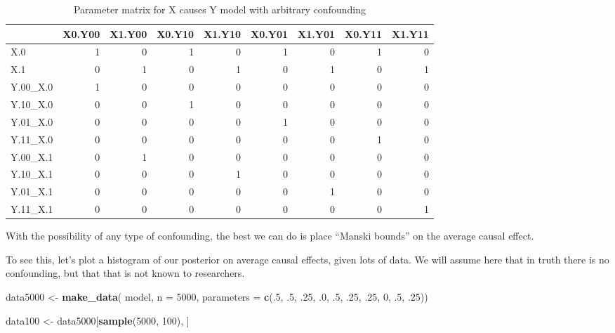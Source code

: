 \documentclass[
  12pt,
]{book}
\newenvironment{Shaded}{\begin{snugshade}}{\end{snugshade}}
\newcommand{\AttributeTok}[1]{\textcolor[rgb]{0.13,0.29,0.53}{#1}}
\newcommand{\DecValTok}[1]{\textcolor[rgb]{0.00,0.00,0.81}{#1}}
\newcommand{\FunctionTok}[1]{\textcolor[rgb]{0.13,0.29,0.53}{\textbf{#1}}}
\newcommand{\NormalTok}[1]{#1}
\newcommand{\OtherTok}[1]{\textcolor[rgb]{0.56,0.35,0.01}{#1}}
\begin{document}
\begin{table}

\caption{\label{tab:unnamed-chunk-58}Parameter matrix for X causes Y model with arbitrary confounding}
\centering
\begin{tabular}[t]{l|r|r|r|r|r|r|r|r}
\hline
  & X0.Y00 & X1.Y00 & X0.Y10 & X1.Y10 & X0.Y01 & X1.Y01 & X0.Y11 & X1.Y11\\
\hline
X.0 & 1 & 0 & 1 & 0 & 1 & 0 & 1 & 0\\
\hline
X.1 & 0 & 1 & 0 & 1 & 0 & 1 & 0 & 1\\
\hline
Y.00\_X.0 & 1 & 0 & 0 & 0 & 0 & 0 & 0 & 0\\
\hline
Y.10\_X.0 & 0 & 0 & 1 & 0 & 0 & 0 & 0 & 0\\
\hline
Y.01\_X.0 & 0 & 0 & 0 & 0 & 1 & 0 & 0 & 0\\
\hline
Y.11\_X.0 & 0 & 0 & 0 & 0 & 0 & 0 & 1 & 0\\
\hline
Y.00\_X.1 & 0 & 1 & 0 & 0 & 0 & 0 & 0 & 0\\
\hline
Y.10\_X.1 & 0 & 0 & 0 & 1 & 0 & 0 & 0 & 0\\
\hline
Y.01\_X.1 & 0 & 0 & 0 & 0 & 0 & 1 & 0 & 0\\
\hline
Y.11\_X.1 & 0 & 0 & 0 & 0 & 0 & 0 & 0 & 1\\
\hline
\end{tabular}
\end{table}

With the possibility of any type of confounding, the best we can do is place ``Manski bounds'' on the average causal effect.

To see this, let's plot a histogram of our posterior on average causal effects, given lots of data. We will assume here that in truth there is no confounding, but that that is not known to researchers.

\begin{Shaded}
\begin{Highlighting}[]
\NormalTok{data5000 }\OtherTok{\textless{}{-}} \FunctionTok{make\_data}\NormalTok{(}
\NormalTok{    model, }\AttributeTok{n =} \DecValTok{5000}\NormalTok{, }
    \AttributeTok{parameters =} \FunctionTok{c}\NormalTok{(.}\DecValTok{5}\NormalTok{, .}\DecValTok{5}\NormalTok{, .}\DecValTok{25}\NormalTok{, .}\DecValTok{0}\NormalTok{, .}\DecValTok{5}\NormalTok{, .}\DecValTok{25}\NormalTok{, .}\DecValTok{25}\NormalTok{, }\DecValTok{0}\NormalTok{, .}\DecValTok{5}\NormalTok{, .}\DecValTok{25}\NormalTok{))}

\NormalTok{data100 }\OtherTok{\textless{}{-}}\NormalTok{ data5000[}\FunctionTok{sample}\NormalTok{(}\DecValTok{5000}\NormalTok{, }\DecValTok{100}\NormalTok{), ]}
\end{Highlighting}
\end{Shaded}
\end{document}
